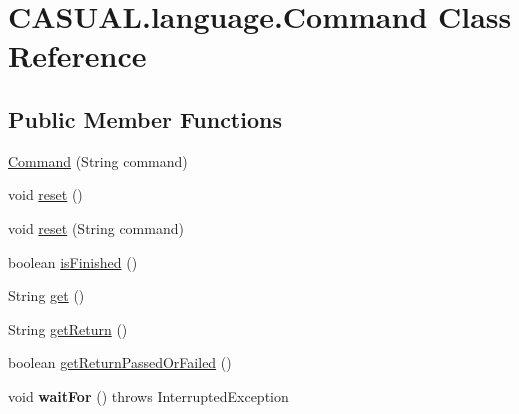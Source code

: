 \hypertarget{class_c_a_s_u_a_l_1_1language_1_1_command}{\section{C\-A\-S\-U\-A\-L.\-language.\-Command Class Reference}
\label{class_c_a_s_u_a_l_1_1language_1_1_command}
}
\subsection*{Public Member Functions}
\begin{DoxyCompactItemize}
\item 
\hyperlink{class_c_a_s_u_a_l_1_1language_1_1_command_ab0a52d9b3d71ee95e39b1c2ce5e63068}{Command} (String command)
\item 
void \hyperlink{class_c_a_s_u_a_l_1_1language_1_1_command_a073d66b1e44a37641668557028e573de}{reset} ()
\item 
void \hyperlink{class_c_a_s_u_a_l_1_1language_1_1_command_a71d195d98823e45cc611d0e5809f8fcb}{reset} (String command)
\item 
boolean \hyperlink{class_c_a_s_u_a_l_1_1language_1_1_command_a196f46b8e013dbec4a1dfc645bcc6334}{is\-Finished} ()
\item 
String \hyperlink{class_c_a_s_u_a_l_1_1language_1_1_command_a441877ec1df39754c0e158e79db295be}{get} ()
\item 
String \hyperlink{class_c_a_s_u_a_l_1_1language_1_1_command_ae35c680d370afbd0219372a21a1a870f}{get\-Return} ()
\item 
boolean \hyperlink{class_c_a_s_u_a_l_1_1language_1_1_command_a105e38ee16fccdb3340a93f661d5d61b}{get\-Return\-Passed\-Or\-Failed} ()
\item 
\hypertarget{class_c_a_s_u_a_l_1_1language_1_1_command_ad05ac4b7c9cbd0e781f234d8cbe38958}{void {\bfseries wait\-For} ()  throws Interrupted\-Exception }\label{class_c_a_s_u_a_l_1_1language_1_1_command_ad05ac4b7c9cbd0e781f234d8cbe38958}


\end{DoxyCompactItemize}
